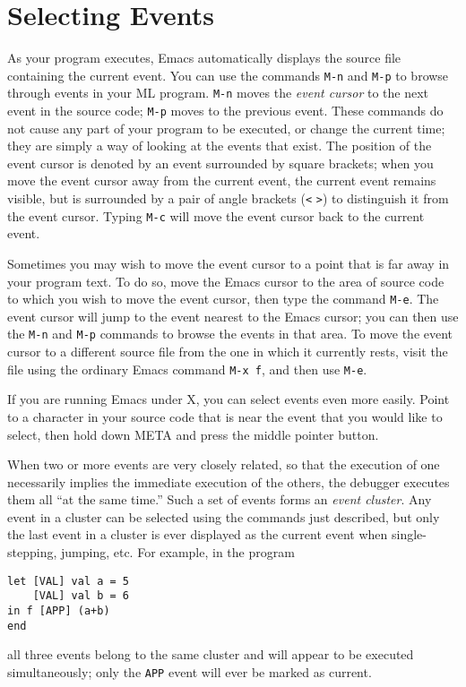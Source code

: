 \section{Selecting Events}
As your program executes, Emacs automatically displays the
source file containing the current event.
You can use the commands \verb'M-n' and \verb'M-p'
to browse through events in your ML
program.  \verb'M-n' moves the {\em event cursor} to the next event in the
source code; \verb'M-p' moves to the previous event.  These commands do not
cause any part of your program to be executed, or change the current
time; they are simply a way of looking at the events that exist.  The
position of the event cursor is denoted by an event surrounded by
square brackets; when you move the event cursor away from the current
event, the current event remains visible, but is surrounded by a pair
of angle brackets (\verb'<' \verb'>') to distinguish it from the event
cursor.  Typing \verb'M-c' will move the event cursor back to the
current event.

Sometimes you may wish to move the event cursor to a point that is far
away in your program text.  To do so, move the Emacs
cursor to the area of source code to which you wish to move the
event cursor, then
type the command \verb'M-e'.  The event cursor will jump to the event nearest
to the Emacs cursor; you can then use the \verb'M-n' and
\verb'M-p' commands to
browse the events in that area.  To move the event cursor to a different
source file from the one in which it currently rests, visit the file
using the ordinary Emacs command \verb'M-x f', and then use \verb'M-e'. 

If you are running Emacs under X, you can select events even more
easily.  Point to a character in your source code that is near the
event that you would like to select, then hold down META and press the
middle pointer button.

When two or more events are very closely related, so that the execution of
one necessarily implies the immediate execution of the others, the debugger
executes them all ``at the same time.''  Such a set of events forms 
an {\em event cluster}. Any event in a cluster can be selected
using the commands just described, but only the last event in a 
cluster is ever displayed as the current event when 
single-stepping, jumping, etc.  For example, in the program
\begin{verbatim}
let [VAL] val a = 5 
    [VAL] val b = 6 
in f [APP] (a+b)
end
\end{verbatim}
all three events belong to the same cluster and will appear to be
executed simultaneously; only the \verb'APP' event will ever be marked
as current.   

